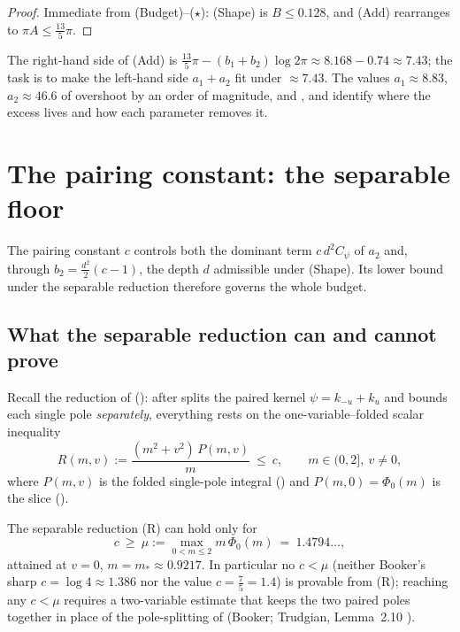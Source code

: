 \begin{proof}
Immediate from \textup{(Budget)}--\textup{($\star$)}: \textup{(Shape)} is
$B\le0.128$, and \textup{(Add)} rearranges to $\pi A\le\tfrac{13}5\pi$.
\end{proof}

The right-hand side of \textup{(Add)} is $\tfrac{13}5\pi-(b_1+b_2)\log2\pi\approx
8.168-0.74\approx 7.43$; the task is to make the left-hand side $a_1+a_2$ fit under
$\approx 7.43$. The values $a_1\approx 8.83$, $a_2\approx 46.6$ of 
overshoot by an order of magnitude, and ,  and
 identify where the excess lives and how each parameter removes it.

\section{The pairing constant: the separable floor}
\label{sec:ls_pairing}

The pairing constant $c$ controls both the dominant term $c\,d^2C_\psi$ of $a_2$ and,
through $b_2=\tfrac{d^2}2(c-1)$, the depth $d$ admissible under \textup{(Shape)}.
Its lower bound under the separable reduction therefore governs the whole budget.

\subsection{What the separable reduction can and cannot prove}

Recall the reduction of  (): after
 splits the paired kernel $\psi=k_{-u}+k_u$ and bounds
each single pole \emph{separately}, everything rests on the one-variable--folded
scalar inequality
\begin{equation}
  R(m,v):=\frac{(m^2+v^2)\,P(m,v)}{m}\ \le\ c,
  \qquad m\in(0,2],\ v\neq 0,
  \tag{R}
  \label{eq:ls_R}
\end{equation}
where $P(m,v)$ is the folded single-pole integral ()
and $P(m,0)=\Phi_0(m)$ is the slice ().

\begin{lemma}
\label{lem:ls_floor}
The separable reduction \textup{(R)} can hold only for
\[
  c\ \ge\ \mu:=\max_{0<m\le 2}m\,\Phi_0(m)\ =\ 1.4794\ldots,
\]
attained at $v=0$, $m=m_\ast\approx 0.9217$. In particular no $c<\mu$ (neither
Booker's sharp $c=\log 4\approx 1.386$ nor the value $c=\tfrac75=1.4$) is provable
from \textup{(R)}; reaching any $c<\mu$ requires a two-variable estimate that keeps
the two paired poles together in place of the pole-splitting of
 (Booker; Trudgian, Lemma~2.10 \cite{TrudgianTuring}).
\end{lemma}

